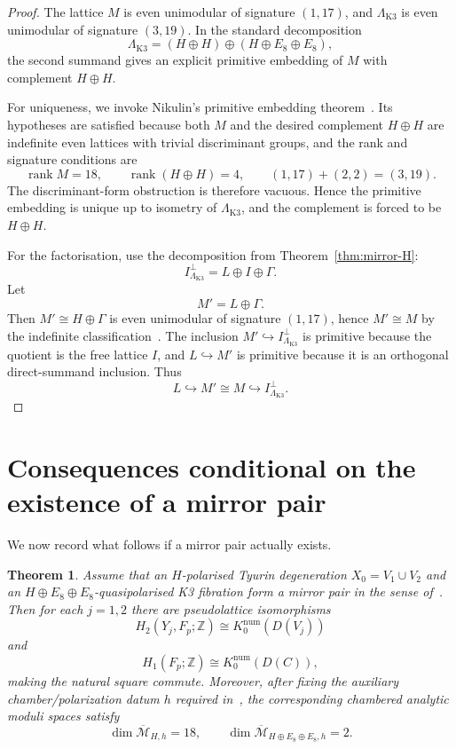 \documentclass[12pt]{article}
\theoremstyle{plain}
\newtheorem{theorem}{Theorem}[section]
\theoremstyle{definition}
\DeclareMathOperator{\rank}{rank}
\newcommand{\bZ}{\mathbb{Z}}
\newcommand{\LambdaK}{\Lambda_{\mathrm{K3}}}
\newcommand{\cM}{\mathcal{M}}
\begin{document}
\begin{proof}
The lattice $M$ is even unimodular of signature $(1,17)$, and $\LambdaK$ is even unimodular of signature $(3,19)$.  In the standard decomposition
\[
\LambdaK = (H\oplus H)\oplus (H\oplus E_8\oplus E_8),
\]
the second summand gives an explicit primitive embedding of $M$ with complement $H\oplus H$.

For uniqueness, we invoke Nikulin's primitive embedding theorem~\cite[Proposition~1.6.1]{Nik80}.  Its hypotheses are satisfied because both $M$ and the desired complement $H\oplus H$ are indefinite even lattices with trivial discriminant groups, and the rank and signature conditions are
\[
\rank M = 18,\qquad \rank(H\oplus H)=4,\qquad (1,17)+(2,2)=(3,19).
\]
The discriminant-form obstruction is therefore vacuous.  Hence the primitive embedding is unique up to isometry of $\LambdaK$, and the complement is forced to be $H\oplus H$.

For the factorisation, use the decomposition from Theorem~\ref{thm:mirror-H}:
\[
I^\perp_{\LambdaK} = L\oplus I\oplus \Gamma.
\]
Let
\[
M' = L\oplus \Gamma.
\]
Then $M'\cong H\oplus\Gamma$ is even unimodular of signature $(1,17)$, hence $M'\cong M$ by the indefinite classification~\cite{MH73}.  The inclusion $M'\hookrightarrow I^\perp_{\LambdaK}$ is primitive because the quotient is the free lattice $I$, and $L\hookrightarrow M'$ is primitive because it is an orthogonal direct-summand inclusion.  Thus
\[
L\hookrightarrow M'\cong M\hookrightarrow I^\perp_{\LambdaK}.
\]
\end{proof}

\section{Consequences conditional on the existence of a mirror pair}

We now record what follows if a mirror pair actually exists.

\begin{theorem}\label{thm:consequences}
Assume that an $H$-polarised Tyurin degeneration $X_0=V_1\cup V_2$ and an $H\oplus E_8\oplus E_8$-quasipolarised K3 fibration form a mirror pair in the sense of~\cite[Definition~5.1]{GT24}.  Then for each $j=1,2$ there are pseudolattice isomorphisms
\[
H_2(Y_j,F_p;\bZ)\cong K_0^{\mathrm{num}}(D(V_j))
\]
and
\[
H_1(F_p;\bZ)\cong K_0^{\mathrm{num}}(D(C)),
\]
making the natural square commute.  Moreover, after fixing the auxiliary chamber/polarization datum $h$ required in~\cite[Theorem~4.7]{AE25}, the corresponding chambered analytic moduli spaces satisfy
\[
\dim \overline{\cM}_{H,h} = 18,
\qquad
\dim \overline{\cM}_{H\oplus E_8\oplus E_8,h}=2.
\]
\end{theorem}
\end{document}
